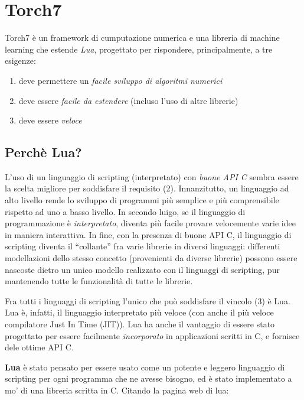 \section{Torch7}
\label{sec:torch}
\nocite{Collobert:2011}

Torch7 \`e un framework di cumputazione numerica e una libreria di machine learning
che estende \emph{Lua}, progettato per rispondere, principalmente, a tre esigenze:

\begin{enumerate}
  \item deve permettere un \emph{facile sviluppo di algoritmi numerici}
  \item deve essere \emph{facile da estendere} (incluso l'uso di altre librerie)
  \item deve essere \emph{veloce}
\end{enumerate}

\subsection{Perch\`e Lua?}
L'uso di un linguaggio di scripting (interpretato) con \emph{buone API C} sembra
essere la scelta migliore per soddisfare il requisito (2). Innanzitutto, un
linguaggio ad alto livello rende lo sviluppo di programmi pi\`u semplice e pi\`u
comprensibile rispetto ad uno a basso livello. In secondo luigo, se il linguaggio
di programmazione \`e \emph{interpretato}, diventa pi\`u facile provare velocemente
varie idee in maniera interattiva. In fine, con la presenza di buone API C, il
linguaggio di scripting diventa il ``collante'' fra varie librerie in diversi
linguaggi: differenti modellazioni dello stesso concetto (provenienti da diverse
librerie) possono essere nascoste dietro un unico modello realizzato con il
linguaggi di scripting, pur mantenendo tutte le funzionalit\`a di tutte le librerie.

Fra tutti i linguaggi di scripting l'unico che pu\`o soddisfare il vincolo (3)
\`e Lua. Lua \`e, infatti, il linguaggio interpretato pi\`u veloce (con anche il
pi\`u veloce compilatore Just In Time (JIT)). Lua ha anche il vantaggio di essere
stato progettato per essere facilmente \emph{incorporato} in applicazioni scritti
in C, e fornisce dele ottime API C.

\textbf{Lua} \`e stato pensato per essere usato come un potente e leggero
linguaggio di scripting per ogni programma che ne avesse bisogno, ed \`e stato
implementato a mo' di una libreria scritta in C. Citando la pagina web di lua:

